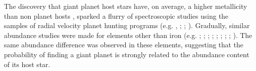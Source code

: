 \documentclass[oldversion]{aa}
\begin{document}
The discovery that giant planet host stars have, on average, a higher metallicity than non planet hosts \citep{Gonzalez-1997}, sparked a flurry of spectroscopic studies using the samples of radial velocity planet hunting programs (e.g. \citeauthor{Santos-2000b}  \citeyear{Santos-2001a}, \citeyear{Santos-2004b}; \citeauthor{Laws-2003} \citeyear{Laws-2003}; \citeauthor{Fischer-2005} \citeyear{Fischer-2005}). Gradually, similar abundance studies were made for elements other than iron (e.g. \citeauthor{Gonzalez-2001} \citeyear{Gonzalez-2001}; \citeauthor{Sadakane-2002} \citeyear{Sadakane-2002}; \citeauthor{Israelian-2003} \citeyear{Israelian-2003}; \citeauthor{Bodaghee-2003} \citeyear{Bodaghee-2003}; \citeauthor{Beirao-2005} \citeyear{Beirao-2005}; \citeauthor{Fischer-2005} \citeyear{Fischer-2005}; \citeauthor{Gilli-2006} \citeyear{Gilli-2006}; \citeauthor{Ecuvillon-2006b} \citeyear{Ecuvillon-2006b}; \citeauthor{Takeda-2007} \citeyear{Takeda-2007}). The same abundance difference was observed in these elements, suggesting that the probability of finding a giant planet is strongly related to the abundance content of its host star. 

\end{document}
